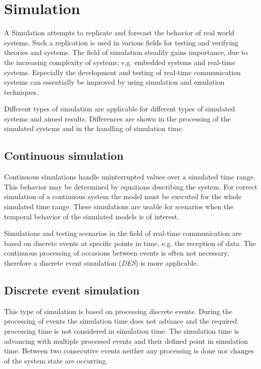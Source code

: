 \chapter{Simulation}
\label{cha:simulation}

A Simulation attempts to replicate and forecast the behavior of real world systems.
Such a replication is used in various fields for testing and verifying theories and systems.
The field of simulation steadily gains importance, due to the increasing complexity of systems; e.g. embedded systems and real-time systems.
Especially the development and testing of real-time communication systems can essentially be improved by using simulation and emulation techniques.

Different types of simulation are applicable for different types of simulated systems and aimed results.
Differences are shown in the processing of the simulated systems and in the handling of simulation time.
\cite[section 1.2]{mchaney2009understanding}

\section{Continuous simulation}
\label{sec:simulation_cont}
Continuous simulations handle uninterrupted values over a simulated time range.
This behavior may be determined by equations describing the system.
For correct simulation of a continuous system the model must be executed for the whole simulated time range.
These simulations are usable for scenarios when the temporal behavior of the simulated models is of interest. \cite[section 1.2.1]{mchaney2009understanding}

Simulations and testing scenarios in the field of real-time communication are based on discrete events at specific points in time, e.g. the reception of data.
The continuous processing of occasions between events is often not necessary, therefore a discrete event simulation (\emph{DES}) is more applicable.

\section{Discrete event simulation}
\label{sec:simulation_event}
This type of simulation is based on processing discrete events.
During the processing of events the simulation time does not advance and the required processing time is not considered in simulation time.
The simulation time is advancing with multiple processed events and their defined point in simulation time.
Between two consecutive events neither any processing is done nor changes of the system state are occurring. \cite[chapter 1]{matloff_introduction_2008}

